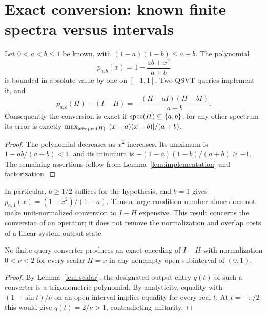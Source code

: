 \section{Exact conversion: known finite spectra versus intervals}\label{sec:exact}
\begin{proposition}\label{prop:two-point}
Let $0<a<b\leq1$ be known, with $(1-a)(1-b)\leq a+b$. The polynomial
\[
 p_{a,b}(x)=1-\frac{ab+x^2}{a+b}
\]
is bounded in absolute value by one on $[-1,1]$. Two QSVT queries implement it, and
\begin{equation}\label{eq:quadratic-error}
 p_{a,b}(H)-(I-H)=-\frac{(H-aI)(H-bI)}{a+b}.
\end{equation}
Consequently the conversion is exact if $\operatorname{spec}(H)\subseteq\{a,b\}$; for any other spectrum its error is exactly
$\max_{x\in\operatorname{spec}(H)}|(x-a)(x-b)|/(a+b)$.
\end{proposition}
\begin{proof}
The polynomial decreases as $x^2$ increases. Its maximum is $1-ab/(a+b)<1$, and its minimum is $-(1-a)(1-b)/(a+b)\geq-1$. The remaining assertions follow from Lemma~\ref{lem:implementation} and factorization.
\end{proof}
In particular, $b\geq1/2$ suffices for the hypothesis, and $b=1$ gives $p_{a,1}(x)=(1-x^2)/(1+a)$. Thus a large condition number alone does not make unit-normalized conversion to $I-H$ expensive. This result concerns the conversion of an operator; it does not remove the normalization and overlap costs of a linear-system output state.

\begin{proposition}\label{prop:no-exact}
No finite-query converter produces an exact encoding of $I-H$ with normalization $0<\nu<2$ for every scalar $H=x$ in any nonempty open subinterval of $(0,1)$.
\end{proposition}
\begin{proof}
By Lemma~\ref{lem:scalar}, the designated output entry $q(t)$ of such a converter is a trigonometric polynomial. By analyticity, equality with $(1-\sin t)/\nu$ on an open interval implies equality for every real $t$. At $t=-\pi/2$ this would give $q(t)=2/\nu>1$, contradicting unitarity.
\end{proof}


